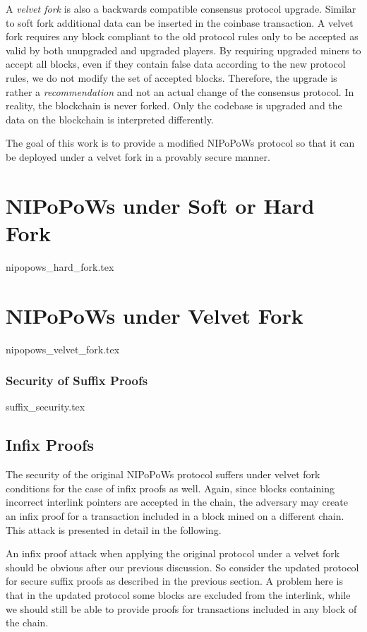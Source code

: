 \documentclass[10pt,a4paper]{article}
\theoremstyle{plain}
\theoremstyle{definition}
\theoremstyle{lemma}
\begin{document}
A \textit{velvet fork} is also a backwards compatible consensus protocol upgrade.
Similar to soft fork additional data can be inserted in the coinbase transaction.
A velvet fork requires any block compliant to the old protocol rules only to be
accepted as valid by both unupgraded and upgraded players. By requiring upgraded
miners to accept all blocks, even if they contain false data according to the new
protocol rules, we do not modify the set of accepted blocks. Therefore, the upgrade
is rather a \textit{recommendation} and not an actual change of the consensus
protocol.  In reality, the blockchain is never forked. Only the codebase is
upgraded and the data on the blockchain is interpreted differently\cite{NIPoPoWs}.


The goal of this work is to provide a modified NIPoPoWs protocol so that it can be
deployed under a velvet fork in a provably secure manner.
\section{NIPoPoWs under Soft or Hard Fork}
{nipopows_hard_fork.tex}

\section{NIPoPoWs under Velvet Fork}
{nipopows_velvet_fork.tex}


\subsubsection{Security of Suffix Proofs}
{suffix_security.tex}


\subsection{Infix Proofs}
The security of the original NIPoPoWs protocol suffers under velvet fork conditions for the case of
infix proofs as well. Again, since blocks containing incorrect interlink pointers are accepted in the 
chain, the adversary may create an infix proof for a transaction included in a block mined on a
different chain. This attack is presented in detail in the following.

An infix proof attack when applying the original protocol under a velvet fork should be obvious
after our previous discussion. So consider the updated protocol for secure suffix proofs as
described in the previous section. A problem here is that in the updated protocol some blocks
are excluded from the interlink, while we should still be able to provide proofs for transactions
included in any block of the chain.
\end{document}

